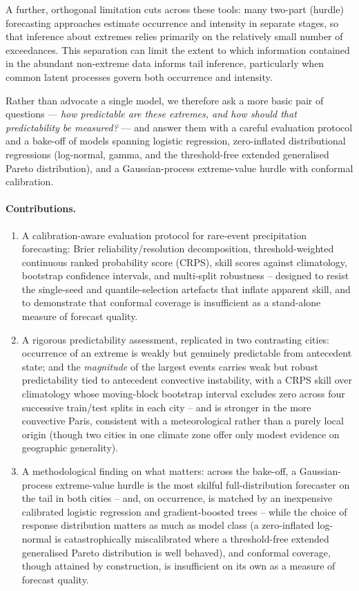 \documentclass[11pt,a4paper]{article}
\begin{document}
A further, orthogonal limitation cuts across these tools: many two-part (hurdle)
forecasting approaches estimate occurrence and intensity in separate stages, so
that inference about extremes relies primarily on the relatively small number of
exceedances. This separation can limit the extent to which information contained
in the abundant non-extreme data informs tail inference, particularly when common
latent processes govern both occurrence and intensity.

Rather than advocate a single model, we therefore ask a more basic pair of
questions --- \emph{how predictable are these extremes, and how should that
predictability be measured?} --- and answer them with a careful evaluation
protocol and a bake-off of models spanning logistic regression, zero-inflated
distributional regressions (log-normal, gamma, and the threshold-free extended
generalised Pareto distribution), and a Gaussian-process extreme-value
hurdle with conformal calibration.

\paragraph{Contributions.}
\begin{enumerate}[leftmargin=1.6em,itemsep=1pt]
  \item A calibration-aware evaluation protocol for rare-event
  precipitation forecasting: Brier reliability/resolution decomposition,
  threshold-weighted continuous ranked probability score (CRPS),
  skill scores against climatology,
  bootstrap confidence intervals, and multi-split robustness -- designed to
  resist the single-seed and quantile-selection artefacts that inflate apparent
  skill, and to demonstrate that conformal coverage is insufficient as a
  stand-alone measure of forecast quality.
  \item A rigorous predictability assessment, replicated in two
  contrasting cities: occurrence of an extreme is weakly but genuinely
  predictable from antecedent state; and the \emph{magnitude} of the largest
  events carries weak but robust predictability tied to antecedent convective
  instability, with a CRPS skill over climatology whose moving-block
  bootstrap interval excludes zero across four successive train/test splits in
  each city -- and is stronger in the more convective Paris, consistent with a
  meteorological rather than a purely local origin (though two cities in one
  climate zone offer only modest evidence on geographic generality).
  \item A methodological finding on what matters: across the bake-off, a
  Gaussian-process extreme-value hurdle is the most skilful full-distribution
  forecaster on the tail in both cities -- and, on occurrence, is matched by an
  inexpensive calibrated logistic regression and gradient-boosted trees -- while
  the choice of response distribution matters as much as model class (a
  zero-inflated log-normal is catastrophically miscalibrated where a threshold-free
  extended generalised Pareto distribution is well behaved), and conformal coverage, though attained by
  construction, is insufficient on its own as a measure of forecast quality.
\end{enumerate}
\end{document}
